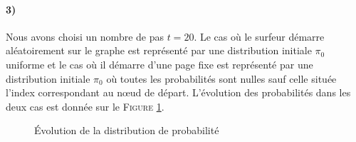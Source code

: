 \documentclass[a4paper,titlepage]{report}
\begin{document}
\paragraph{3)} Nous avons choisi un nombre de pas $t = 20$. Le cas où le surfeur démarre aléatoirement sur le graphe est représenté par une distribution initiale $\pi_0$ uniforme et le cas où il démarre d'une page fixe est représenté par une distribution initiale $\pi_0$ où toutes les probabilités sont nulles sauf celle située l'index correspondant au nœud de départ. L'évolution des probabilités dans les deux cas est donnée sur le \textsc{Figure} \ref{fig:q113}.
\begin{figure}[h]
	\center
	\caption{Évolution de la distribution de probabilité}
	\label{fig:q113}
\end{figure}
\end{document}
